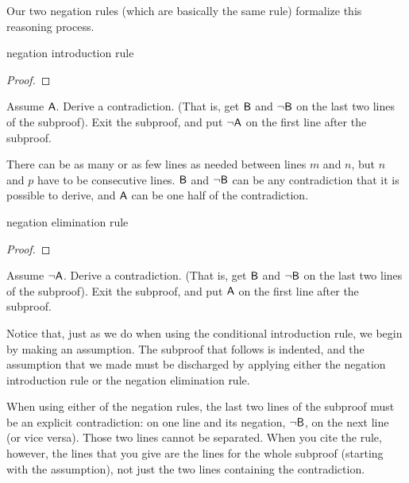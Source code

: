 Our two negation rules (which are basically the same rule) formalize this reasoning process.

\medskip


\begin{factboxy}{negation introduction rule}
\begin{proof}
\open
	\as{}
\close
{}
\end{proof}

\small{Assume $\mathsf{A}$. Derive a contradiction. (That is, get $\mathsf{B}$ and ${\neg}\mathsf{B}$ on the last two lines of the subproof). Exit the subproof, and put ${\neg}\mathsf{A}$ on the first line after the subproof.
\smallskip

There can be as many or as few lines as needed between lines $m$ and $n$, but $n$ and $p$ have to be consecutive lines. $\mathsf{B}$ and ${\neg}\mathsf{B}$ can be any contradiction that it is possible to derive, and $\mathsf{A}$ can be one half of the contradiction.}

\end{factboxy}

\begin{factboxy}{negation elimination rule}
\begin{proof}
\open
	\as{}
\close
{}
\end{proof}

\small{Assume ${\neg}\mathsf{A}$. Derive a contradiction. (That is, get $\mathsf{B}$ and ${\neg}\mathsf{B}$ on the last two lines of the subproof). Exit the subproof, and put $\mathsf{A}$ on the first line after the subproof.}

\end{factboxy}

\medskip

\noindent Notice that, just as we do when using the conditional introduction rule, we begin by making an assumption. The subproof that follows is indented, and the assumption that we made must be discharged by applying either the negation introduction rule or the negation elimination rule. 

When using either of the negation rules, the last two lines of the subproof must be an explicit contradiction:  on one line and its negation, ${\neg}\mathsf{B}$, on the next line (or vice versa). Those two lines cannot be separated. When you cite the rule, however, the lines that you give are the lines for the whole subproof (starting with the assumption), not just the two lines containing the contradiction. 

